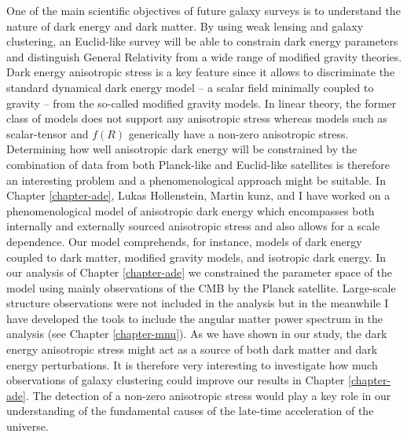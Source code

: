 One of the main scientific objectives of future galaxy surveys is to understand the nature of dark energy and dark matter. By using weak lensing and galaxy clustering, an Euclid-like survey will be able to constrain dark energy parameters and distinguish General Relativity from a wide range of modified gravity theories. Dark energy anisotropic stress is a key feature since it allows to discriminate the standard dynamical dark energy model -- a scalar field minimally coupled to gravity -- from the so-called modified gravity models. In linear theory, the former class of models does not support any anisotropic stress whereas models such as scalar-tensor and $f(R)$ generically have a non-zero anisotropic stress. Determining how well anisotropic dark energy will be constrained by the combination of data from both Planck-like and Euclid-like satellites is therefore an interesting problem and a phenomenological approach might be suitable. In Chapter \ref{chapter-ade}, Lukas Hollenstein, Martin kunz, and I have worked on a phenomenological model of anisotropic dark energy which encompasses both internally and externally sourced anisotropic stress and also allows for a scale dependence. Our model comprehends, for instance, models of dark energy coupled to dark matter, modified gravity models, and isotropic dark energy. In our analysis of Chapter \ref{chapter-ade} we constrained the parameter space of the model using mainly observations of the CMB by the Planck satellite. Large-scale structure observations  were not included in the analysis but in the meanwhile I have developed the tools to include the angular matter power spectrum in the analysis (see Chapter \ref{chapter-mnu}). As we have shown in our study, the dark energy anisotropic stress might act as a source of both dark matter and dark energy perturbations. It is therefore very interesting to investigate how much observations of galaxy clustering could improve our results in Chapter \ref{chapter-ade}. The detection of a non-zero anisotropic stress would play a key role in our understanding of the fundamental causes of the late-time acceleration of the universe. 
